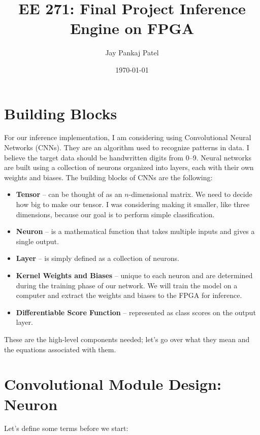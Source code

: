 \documentclass{article}
\title{EE 271: Final Project Inference Engine on FPGA}
\author{Jay Pankaj Patel}
\date{\today}
\begin{document}
\maketitle
\tableofcontents
\newpage
\section{Building Blocks}
For our inference implementation, I am considering using Convolutional Neural Networks (CNNs). They are an algorithm used to recognize patterns in data. I believe the target data should be handwritten digits from 0--9. Neural networks are built using a collection of neurons organized into layers, each with their own weights and biases. The building blocks of CNNs are the following:
\begin{itemize}
  \item \textbf{Tensor} -- can be thought of as an $n$-dimensional matrix. We need to decide how big to make our tensor. I was considering making it smaller, like three dimensions, because our goal is to perform simple classification.
  \item \textbf{Neuron} -- is a mathematical function that takes multiple inputs and gives a single output.
  \item \textbf{Layer} -- is simply defined as a collection of neurons.
  \item \textbf{Kernel Weights and Biases} -- unique to each neuron and are determined during the training phase of our network. We will train the model on a computer and extract the weights and biases to the FPGA for inference.
  \item \textbf{Differentiable Score Function} -- represented as class scores on the output layer.
\end{itemize}
These are the high-level components needed; let's go over what they mean and the equations associated with them.

\section{Convolutional Module Design: Neuron}
Let's define some terms before we start:
\end{document}
